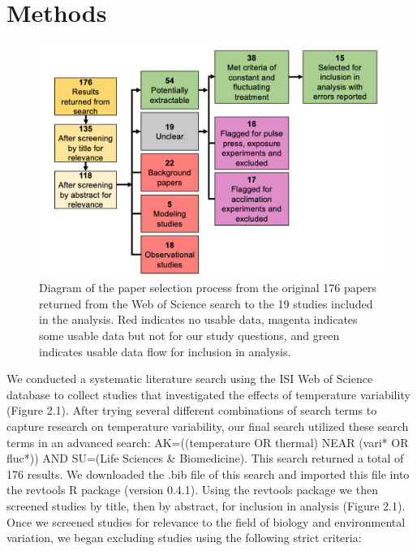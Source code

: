 \documentclass[12pt,twoside]{reedthesis}
\begin{document}
\hypertarget{methods}{%
\chapter{Methods}\label{methods}}
\begin{figure}

{\centering \includegraphics[width=0.9\linewidth]{figures/figure5} 

}

\caption[Meta-analysis paper selection process]{Diagram of the paper selection process from the original 176 papers returned from the Web of Science search to the 19 studies included in the analysis. Red indicates no usable data, magenta indicates some usable data but not for our study questions, and green indicates usable data flow for inclusion in analysis.}\label{fig:unnamed-chunk-7}
\end{figure}
We conducted a systematic literature search using the ISI Web of Science database to collect studies that investigated the effects of temperature variability (Figure 2.1). After trying several different combinations of search terms to capture research on temperature variability, our final search utilized these search terms in an advanced search: AK=((temperature OR thermal) NEAR (vari* OR fluc*)) AND SU=(Life Sciences \& Biomedicine). This search returned a total of 176 results. We downloaded the .bib file of this search and imported this file into the revtools R package (version 0.4.1). Using the revtools package we then screened studies by title, then by abstract, for inclusion in analysis (Figure 2.1). Once we screened studies for relevance to the field of biology and environmental variation, we began excluding studies using the following strict criteria:
\end{document}
